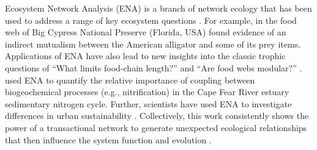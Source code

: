 \documentclass[11pt]{article}
\begin{document}
\begin{spacing}{2}

Ecosystem Network Analysis (ENA) is a branch of network ecology that
has been used to address a range of key ecosystem questions
\citep{borrett12_netecol, fath99_review, ulanowicz86}.
For example, in the food web of Big Cypress National Preserve
(Florida, USA) \citet{bondavalli99} found evidence of an indirect
mutualism between the American alligator and some of its prey
items. Applications of ENA have also lead to new insights into the
classic trophic questions of ``What limits food-chain length?''
\citep{ulanowicz2014} and ``Are food webs modular?''  \citep{krause04,
  allesina05_scc, borrett07_jtb}.  \citet{hines12} used ENA to
quantify the relative importance of coupling between biogeochemical
processes (e.g., nitrification) in the Cape Fear River estuary
sedimentary nitrogen cycle.  Further, scientists have used ENA to
investigate differences in urban sustainability \citep{bodini02,
  zhang10_ecomod, chen12, bodini2012cities}.  Collectively, this work
consistently shows the power of a transactional network to generate
unexpected ecological relationships that then influence the system
function and evolution \citep{ulanowicz97, patten91,
  jorgensen07_newecology}.



\end{spacing}
\end{document}
